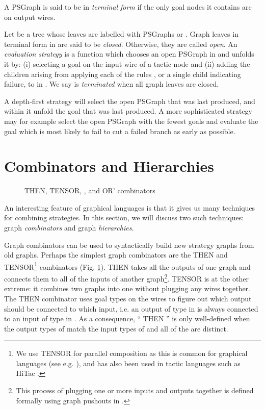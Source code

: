 \documentclass{llncs}
\begin{document}
\begin{definition} \rm
A PSGraph is said to be in \emph{terminal form} if the only goal nodes it contains are on output wires. 
\end{definition}

\begin{definition} \rm
Let  be a tree whose leaves are labelled with PSGraphs or . Graph leaves in terminal form in  are said to be \textit{closed}. Otherwise, they are called \textit{open}. An \emph{evaluation strategy} is a function  which chooses an open PSGraph  in  and unfolds it by: (i) selecting a goal  on the input wire of a tactic node  and (ii) adding
the children arising from applying each of the rules , or a single child  indicating failure, to  in . We say  is \emph{terminated} when all graph leaves are closed.
\end{definition}

\begin{example}
A depth-first strategy  will select the open PSGraph that was last produced, and within it unfold the
goal that was last produced. A more sophisticated strategy  may for example select the open PSGraph with the
fewest goals and evaluate the goal which is most likely to fail to cut a failed branch as early as possible.
\end{example}

\beforesection
\section{Combinators and Hierarchies}\label{sec:graph-tactics}
\aftersection

\begin{figure}
\centering
  \caption{\label{fig:then-and-tensor} THEN, TENSOR, , and OR' combinators}
\end{figure}

\noindent An interesting feature of graphical  languages is that it gives us many techniques for
combining strategies. In this section, we will discuss two such techniques: graph \textit{combinators} and graph \textit{hierarchies}.

Graph combinators can be used to syntactically build new strategy graphs from old graphs. Perhaps the simplest graph combinators are the THEN and TENSOR\footnote{We use TENSOR for parallel composition as this is common for graphical languages (see e.g. \cite{paper:Selinger:09}),
and has also been used in tactic languages such as HiTac  \cite{paper:Aspinall:2008}.}
combinators  (Fig. \ref{fig:then-and-tensor}). THEN takes all the outputs of one graph and connects them to all of the inputs of another graph\footnote{This process of plugging one or more inputs and outputs together is defined formally using graph pushouts in \cite{paper:Dixon:10}.}. TENSOR is at the other extreme: it combines two graphs into one without plugging any wires together.
The THEN combinator uses goal types on the wires to figure out which output should be connected to which input, i.e. an output of type  in  is always connected to an input of type  in . As a consequence, `` THEN '' is only well-defined when the output types of  match the input types of  and all of the  are distinct.
\end{document}
